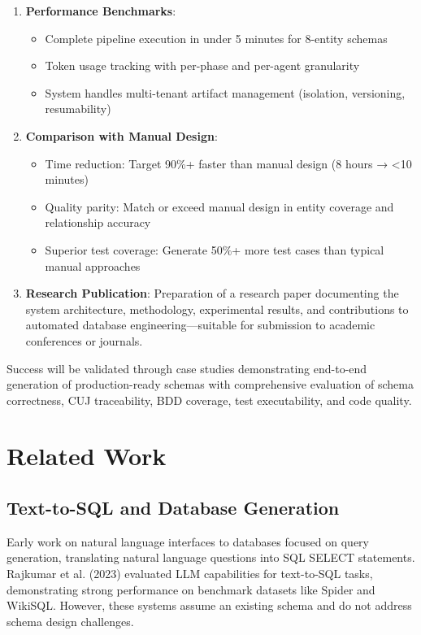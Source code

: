 \documentclass[12pt,a4paper]{article}
\begin{document}
\begin{enumerate}
\item \textbf{Performance Benchmarks}:
\begin{itemize}
\item Complete pipeline execution in under 5 minutes for 8-entity schemas
\item Token usage tracking with per-phase and per-agent granularity
\item System handles multi-tenant artifact management (isolation, versioning, resumability)
\end{itemize}

\item \textbf{Comparison with Manual Design}:
\begin{itemize}
\item Time reduction: Target 90\%+ faster than manual design (8 hours → <10 minutes)
\item Quality parity: Match or exceed manual design in entity coverage and relationship accuracy
\item Superior test coverage: Generate 50\%+ more test cases than typical manual approaches
\end{itemize}

\item \textbf{Research Publication}: Preparation of a research paper documenting the system architecture, methodology, experimental results, and contributions to automated database engineering—suitable for submission to academic conferences or journals.
\end{enumerate}

Success will be validated through case studies demonstrating end-to-end generation of production-ready schemas with comprehensive evaluation of schema correctness, CUJ traceability, BDD coverage, test executability, and code quality.

\section{Related Work}

\subsection{Text-to-SQL and Database Generation}

Early work on natural language interfaces to databases focused on query generation, translating natural language questions into SQL SELECT statements. Rajkumar et al. (2023) evaluated LLM capabilities for text-to-SQL tasks, demonstrating strong performance on benchmark datasets like Spider and WikiSQL. However, these systems assume an existing schema and do not address schema design challenges.
\end{document}
